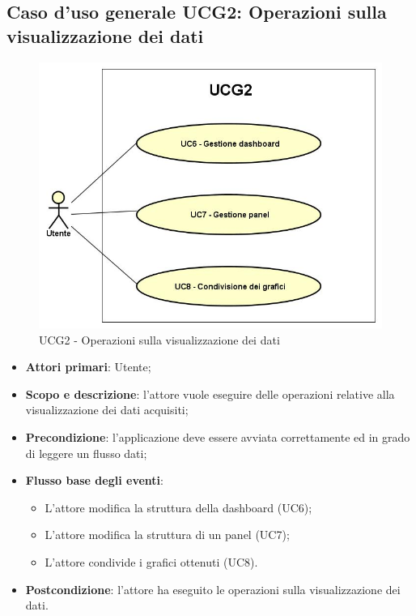 \subsection{Caso d'uso generale UCG2: Operazioni sulla visualizzazione dei dati}
\begin{figure} [H]
	\centering
	\includegraphics[scale=0.5]{Img/UCG2}
	\caption{UCG2 - Operazioni sulla visualizzazione dei dati}
\end{figure}
\begin{itemize}
	\item{\textbf{Attori primari}: Utente;}
	\item{\textbf{Scopo e descrizione}: l'attore vuole eseguire delle operazioni relative alla visualizzazione dei dati acquisiti;}
	\item{\textbf{Precondizione}: l'applicazione deve essere avviata correttamente ed in grado di leggere un flusso dati;}
	\item{\textbf{Flusso base degli eventi}:
		\begin{itemize}
			\item{L'attore modifica la struttura della dashboard (UC6);}
			\item{L'attore modifica la struttura di un panel (UC7);}
			\item{L'attore condivide i grafici ottenuti (UC8)}.
		\end{itemize}
	}
	\item{\textbf{Postcondizione}: l'attore ha eseguito le operazioni sulla visualizzazione dei dati.}
\end{itemize}
\newpage
